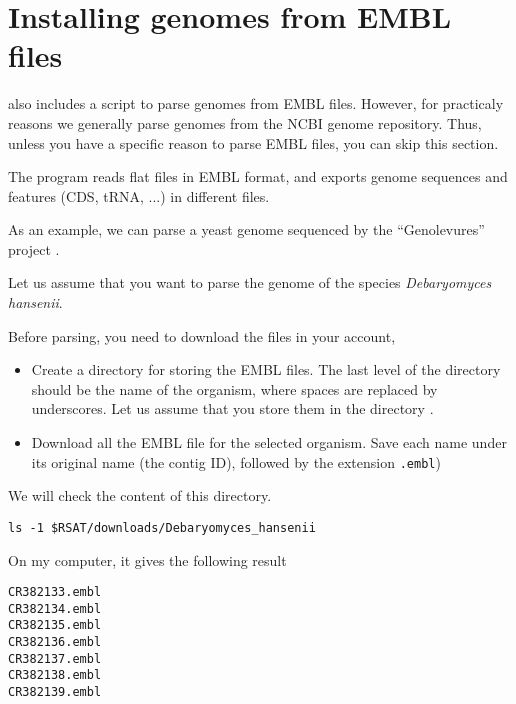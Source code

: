\section{Installing genomes from EMBL files}

\RSAT also includes a script  to parse genomes
from EMBL files. However, for practicaly reasons we generally parse
genomes from the NCBI genome repository. Thus, unless you have a
specific reason to parse EMBL files, you can skip this section.

The program  reads flat files in EMBL format,
and exports genome sequences and features (CDS, tRNA, ...) in
different files.

As an example, we can parse a yeast genome sequenced by the
``Genolevures'' project
.

Let us assume that you want to parse the genome of the species
\textit{Debaryomyces hansenii}.

Before parsing, you need to download the files in your account, 

\begin{itemize}
\item Create a directory for storing the EMBL files. The last level of
  the directory should be the name of the organism, where spaces are
  replaced by underscores. Let us assume that you store them in
  the directory .

\item Download all the EMBL file for the selected organism. Save each
  name under its original name (the contig ID), followed by the
  extension \texttt{.embl})

\end{itemize}

We will check the content of this directory.

\begin{footnotesize}
\begin{verbatim}
ls -1 $RSAT/downloads/Debaryomyces_hansenii
\end{verbatim}
\end{footnotesize}

On my computer, it gives the following result

\begin{footnotesize}
\begin{verbatim}
CR382133.embl
CR382134.embl
CR382135.embl
CR382136.embl
CR382137.embl
CR382138.embl
CR382139.embl
\end{verbatim}
\end{footnotesize}

